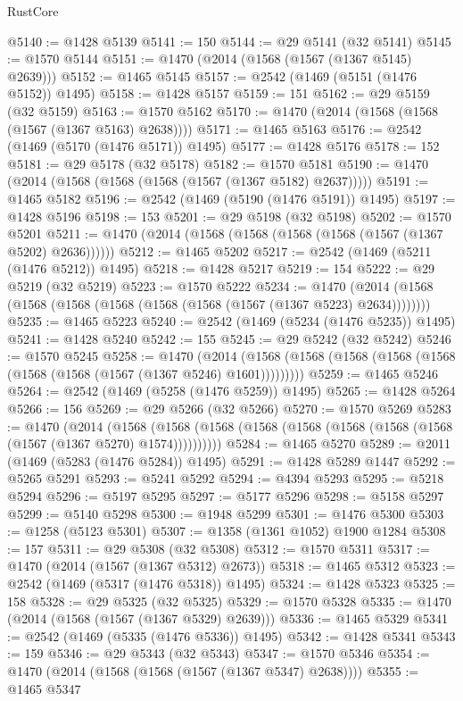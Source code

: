 \begin{lexlean}{RustCore}
\begin{coremodule}
{\begin{coremodule}
{{{{{{{{{{{{{{{{{{{{{{{{{{{{{{{{{{{{{{{{{{{{{{{@5140 := @1428 @5139
@5141 := 150
@5144 := @29 @5141 (@32 @5141)
@5145 := @1570 @5144
@5151 := @1470 (@2014 (@1568 (@1567 (@1367 @5145) @2639)))
@5152 := @1465 @5145
@5157 := @2542 (@1469 (@5151 (@1476 @5152)) @1495)
@5158 := @1428 @5157
@5159 := 151
@5162 := @29 @5159 (@32 @5159)
@5163 := @1570 @5162
@5170 := @1470 (@2014 (@1568 (@1568 (@1567 (@1367 @5163) @2638))))
@5171 := @1465 @5163
@5176 := @2542 (@1469 (@5170 (@1476 @5171)) @1495)
@5177 := @1428 @5176
@5178 := 152
@5181 := @29 @5178 (@32 @5178)
@5182 := @1570 @5181
@5190 := @1470 (@2014 (@1568 (@1568 (@1568 (@1567 (@1367 @5182) @2637)))))
@5191 := @1465 @5182
@5196 := @2542 (@1469 (@5190 (@1476 @5191)) @1495)
@5197 := @1428 @5196
@5198 := 153
@5201 := @29 @5198 (@32 @5198)
@5202 := @1570 @5201
@5211 := @1470 (@2014 (@1568 (@1568 (@1568 (@1568 (@1567 (@1367 @5202) @2636))))))
@5212 := @1465 @5202
@5217 := @2542 (@1469 (@5211 (@1476 @5212)) @1495)
@5218 := @1428 @5217
@5219 := 154
@5222 := @29 @5219 (@32 @5219)
@5223 := @1570 @5222
@5234 := @1470 (@2014 (@1568 (@1568 (@1568 (@1568 (@1568 (@1568 (@1567 (@1367 @5223) @2634))))))))
@5235 := @1465 @5223
@5240 := @2542 (@1469 (@5234 (@1476 @5235)) @1495)
@5241 := @1428 @5240
@5242 := 155
@5245 := @29 @5242 (@32 @5242)
@5246 := @1570 @5245
@5258 := @1470
    (@2014 (@1568 (@1568 (@1568 (@1568 (@1568 (@1568 (@1568 (@1567 (@1367 @5246) @1601)))))))))
@5259 := @1465 @5246
@5264 := @2542 (@1469 (@5258 (@1476 @5259)) @1495)
@5265 := @1428 @5264
@5266 := 156
@5269 := @29 @5266 (@32 @5266)
@5270 := @1570 @5269
@5283 := @1470
    (@2014
      (@1568 (@1568 (@1568 (@1568 (@1568 (@1568 (@1568 (@1568 (@1567 (@1367 @5270) @1574))))))))))
@5284 := @1465 @5270
@5289 := @2011 (@1469 (@5283 (@1476 @5284)) @1495)
@5291 := @1428 @5289 @1447
@5292 := @5265 @5291
@5293 := @5241 @5292
@5294 := @4394 @5293
@5295 := @5218 @5294
@5296 := @5197 @5295
@5297 := @5177 @5296
@5298 := @5158 @5297
@5299 := @5140 @5298
@5300 := @1948 @5299
@5301 := @1476 @5300
@5303 := @1258 (@5123 @5301)
@5307 := @1358 (@1361 @1052) @1900 @1284
@5308 := 157
@5311 := @29 @5308 (@32 @5308)
@5312 := @1570 @5311
@5317 := @1470 (@2014 (@1567 (@1367 @5312) @2673))
@5318 := @1465 @5312
@5323 := @2542 (@1469 (@5317 (@1476 @5318)) @1495)
@5324 := @1428 @5323
@5325 := 158
@5328 := @29 @5325 (@32 @5325)
@5329 := @1570 @5328
@5335 := @1470 (@2014 (@1568 (@1567 (@1367 @5329) @2639)))
@5336 := @1465 @5329
@5341 := @2542 (@1469 (@5335 (@1476 @5336)) @1495)
@5342 := @1428 @5341
@5343 := 159
@5346 := @29 @5343 (@32 @5343)
@5347 := @1570 @5346
@5354 := @1470 (@2014 (@1568 (@1568 (@1567 (@1367 @5347) @2638))))
@5355 := @1465 @5347
}}}}}}}}}}}}}}}}}}}}}}}}}}}}}}}}}}}}}}}}}}}}}}}
\end{coremodule}}
\end{coremodule}
\end{lexlean}
